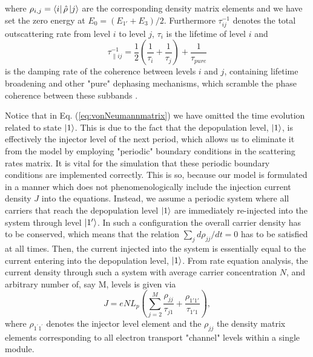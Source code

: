 \documentclass[10pt,letterpaper]{article}
\begin{document}
where $\rho_{i,j} = \Bra{i} \hat{\rho} \Ket{j}$ are the corresponding density matrix elements and we have set the zero energy at $E_0 = (E_{1'}+E_{3})/2 $. Furthermore $\tau_{ij}^{-1}$ denotes the total outscattering rate from level $i$ to level $j$, $\tau_{i}$ is the lifetime of level $i$ and
$$
\tau_{\parallel ij}^{-1} = \frac{1}{2}(\frac{1}{\tau_{i}} +\frac{1}{\tau_{j}}) + \frac{1}{\tau_{pure}}   
$$
is the damping rate of the coherence between levels $i$ and $j$, containing lifetime broadening and other "pure" dephasing mechanisms, which scramble the phase coherence between these subbands \cite{callebaut2005importance}. 

Notice that in Eq. (\ref{eq:vonNeumannmatrix}) we have omitted the time evolution related to state $\Ket{1}$. This is due to the fact that the depopulation level, $\Ket{1}$, is effectively the injector level of the next period, which allows us to eliminate it from the model by employing "periodic" boundary conditions in the scattering rates matrix. It is vital for the simulation that these periodic boundary conditions are implemented correctly. This is so, because our model is formulated in a manner which does not phenomenologically include the injection current density $J$ into the equations. Instead, we assume a periodic system where all carriers that reach the depopulation level $\Ket{1}$ are immediately re-injected into the system through level $\Ket{1'}$. In such a configuration the overall carrier density has to be conserved, which means that the relation $\sum_{j} d \rho_{jj}/dt =0 $ has to be satisfied at all times. Then, the current injected into the system is essentially equal to the current entering into the depopulation level, $\Ket{1}$. From rate equation analysis, the current density through such a system with average carrier concentration $N$, and arbitrary number of, say M,  levels is given via 
\begin{equation}
J = e N  L_p \left( \sum_{j=2}^{M}\frac{\rho_{jj}}{\tau_{j1}} + \frac{\rho_{1'1'}}{\tau_{1'1}} \right),
\end{equation}
where $\rho_{1^\prime 1^\prime}$ denotes the injector level element and the $\rho_{jj}$ the density matrix elements corresponding to all electron transport "channel" levels within a single module.   
\end{document}
